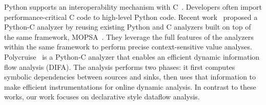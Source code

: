 Python supports an interoperability mechanism with C~\cite{PythonC}.
Developers often import performance-critical C code to high-level Python code.
Recent work~\cite{sas2021} proposed a Python-C analyzer by reusing existing
Python and C analyzers built on top of the same framework, MOPSA~\cite{Mopsa}.
They leverage the full features of the analyzers within the same framework to
perform precise context-sensitive value analyses.  Polycruise~\cite{polycruise}
is a Python-C analyzer that enables an efficient dynamic information flow
analysis (DIFA).  The analysis performs two phases: it first computes symbolic
dependencies between sources and sinks, then uses that information to make
efficient instrumentations for online dynamic analysis.  In contrast to these
works, our work focuses on declarative style dataflow analysis.
